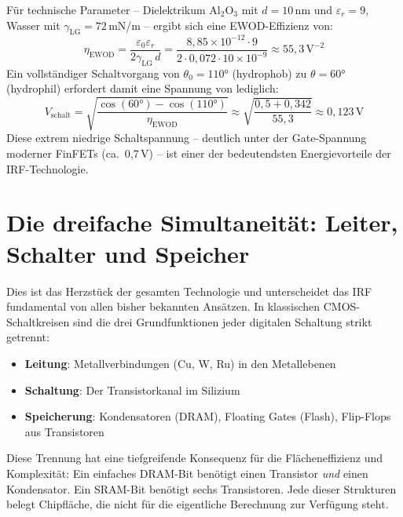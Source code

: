 ﻿\documentclass[a4paper,12pt]{scrreprt}
\theoremstyle{definition}
\begin{document}
Für technische Parameter -- Dielektrikum Al$_2$O$_3$ mit $d = 10$\,nm und
$\varepsilon_r = 9$, Wasser mit $\gamma_{\mathrm{LG}} = 72$\,mN/m -- ergibt sich
eine EWOD-Effizienz von:
\begin{equation}
	\eta_{\mathrm{EWOD}} = \frac{\varepsilon_0 \varepsilon_r}{2\gamma_{\mathrm{LG}}\, d}
	= \frac{8{,}85 \times 10^{-12} \cdot 9}{2 \cdot 0{,}072 \cdot 10 \times 10^{-9}}
	\approx 55{,}3\,\text{V}^{-2}
	\label{eq:ewod_effizienz}
\end{equation}
Ein vollständiger Schaltvorgang von $\theta_0 = 110 °$ (hydrophob) zu
$\theta = 60 °$ (hydrophil) erfordert damit eine Spannung von lediglich:
\begin{equation}
	V_{\mathrm{schalt}} = \sqrt{\frac{\cos(60 °) - \cos(110 °)}{\eta_{\mathrm{EWOD}}}}
	\approx \sqrt{\frac{0{,}5 + 0{,}342}{55{,}3}} \approx 0{,}123\,\text{V}
	\label{eq:schaltspannung}
\end{equation}
Diese extrem niedrige Schaltspannung -- deutlich unter der Gate-Spannung
moderner FinFETs (ca.\ 0{,}7\,V) -- ist einer der bedeutendsten
Energievorteile der IRF-Technologie.

\section{Die dreifache Simultaneität: Leiter, Schalter und Speicher}

Dies ist das Herzstück der gesamten Technologie und unterscheidet das IRF
fundamental von allen bisher bekannten Ansätzen. In klassischen
CMOS-Schaltkreisen sind die drei Grundfunktionen jeder digitalen Schaltung
strikt getrennt:

\begin{itemize}
	\item \textbf{Leitung}: Metallverbindungen (Cu, W, Ru) in den Metallebenen
	\item \textbf{Schaltung}: Der Transistorkanal im Silizium
	\item \textbf{Speicherung}: Kondensatoren (DRAM), Floating Gates (Flash),
	Flip-Flops aus Transistoren
\end{itemize}

Diese Trennung hat eine tiefgreifende Konsequenz für die Flächeneffizienz und
Komplexität: Ein einfaches DRAM-Bit benötigt einen Transistor \emph{und}
einen Kondensator. Ein SRAM-Bit benötigt sechs Transistoren. Jede dieser
Strukturen belegt Chipfläche, die nicht für die eigentliche Berechnung
zur Verfügung steht.
\end{document}

